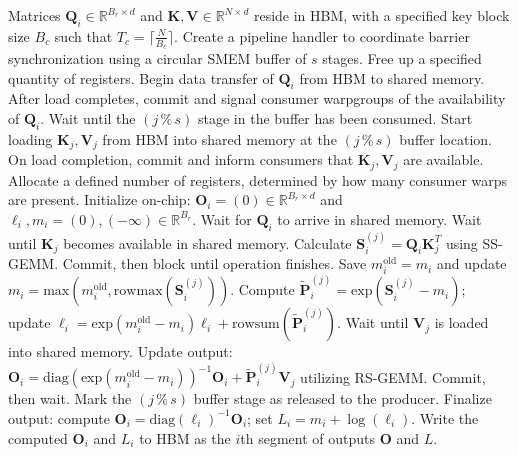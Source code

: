 \begin{enumerate}
\begin{algorithm}[H]
    \caption{\small\label{alg:flash3_wgmma_ws_only}\textsc{FlashAttention-3} forward pass \textbf{without} intra-consumer overlapping -- CTA perspective}
    \begin{algorithmic}[1]
\REQUIRE Matrices $\mathbf{Q}_i \in \mathbb{R}^{B_r \times d}$ and $\mathbf{K}, \mathbf{V} \in \mathbb{R}^{N \times d}$ reside in HBM, with a specified key block size $B_c$ such that $T_c = \lceil \frac{N}{B_c} \rceil$.
\STATE Create a pipeline handler to coordinate barrier synchronization using a circular SMEM buffer of $s$ stages.
\STATE Free up a specified quantity of registers.
\STATE Begin data transfer of $\mathbf{Q}_i$ from HBM to shared memory.
\STATE After load completes, commit and signal consumer warpgroups of the availability of $\mathbf{Q}_i$.
    \STATE Wait until the $(j\,\%\,s)$ stage in the buffer has been consumed.
    \STATE Start loading $\mathbf{K}_j, \mathbf{V}_j$ from HBM into shared memory at the $(j\,\%\,s)$ buffer location.
    \STATE On load completion, commit and inform consumers that $\mathbf{K}_j, \mathbf{V}_j$ are available.
\ENDFOR
\ELSE \STATE Allocate a defined number of registers, determined by how many consumer warps are present.
\STATE Initialize on-chip: $\mathbf{O}_i = (0) \in \mathbb{R}^{B_r \times d}$ and $\ell_i, m_i = (0), (-\infty) \in \mathbb{R}^{B_r}$.
\STATE Wait for $\mathbf{Q}_i$ to arrive in shared memory.
\STATE Wait until $\mathbf{K}_j$ becomes available in shared memory.
\STATE Calculate $\mathbf{S}_i^{(j)} = \mathbf{Q}_i \mathbf{K}_j^T$ using SS-GEMM. Commit, then block until operation finishes. \label{alg:ws_only_gemm1}
\STATE Save $m_i^{\mathrm{old}} = m_i$ and update $m_i = \mathrm{max}(m_i^{\mathrm{old}}, \mathrm{rowmax}(\mathbf{S}_i^{(j)}))$. \label{code-ws:softmax_start}
\STATE Compute $\widetilde{\mathbf{P}}_i^{(j)} = \mathrm{exp}(\mathbf{S}_i^{(j)} - m_i)$; update $\ell_i = \mathrm{exp}(m_i^{\mathrm{old}} - m_i) \ell_i + \mathrm{rowsum}(\widetilde{\mathbf{P}}_i^{(j)})$. \label{code-ws:softmax_end}
\STATE Wait until $\mathbf{V}_j$ is loaded into shared memory.
\STATE Update output: $\mathbf{O}_i = \mathrm{diag}(\mathrm{exp}(m_i^{\mathrm{old}} - m_i))^{-1} \mathbf{O}_i + \widetilde{\mathbf{P}}_i^{(j)} \mathbf{V}_j$ utilizing RS-GEMM. Commit, then wait. \label{alg:ws_only_gemm2}
\STATE Mark the $(j\,\%\,s)$ buffer stage as released to the producer.
\ENDFOR
\STATE Finalize output: compute $\mathbf{O}_i = \mathrm{diag}(\ell_i)^{-1} \mathbf{O}_i$; set $L_i = m_i + \log(\ell_i)$.
\STATE Write the computed $\mathbf{O}_i$ and $L_i$ to HBM as the $i$th segment of outputs $\mathbf{O}$ and $L$.
\ENDIF
\end{algorithmic}
\end{algorithm}


\end{enumerate}
